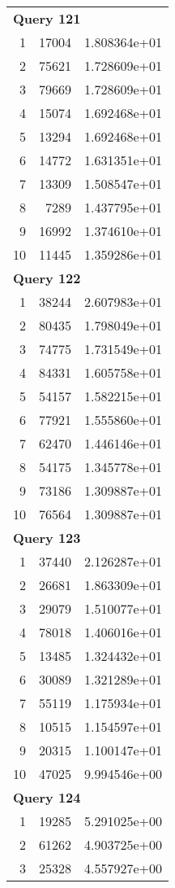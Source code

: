 \begin{longtable}[{p}]{@{}rrp{}@{}}
\midrule
\multicolumn{3}{l}{\bfseries Query 121} \\
1 & 17004 & 1.808364e+01 \\
2 & 75621 & 1.728609e+01 \\
3 & 79669 & 1.728609e+01 \\
4 & 15074 & 1.692468e+01 \\
5 & 13294 & 1.692468e+01 \\
6 & 14772 & 1.631351e+01 \\
7 & 13309 & 1.508547e+01 \\
8 & 7289 & 1.437795e+01 \\
9 & 16992 & 1.374610e+01 \\
10 & 11445 & 1.359286e+01 \\
\midrule
\multicolumn{3}{l}{\bfseries Query 122} \\
1 & 38244 & 2.607983e+01 \\
2 & 80435 & 1.798049e+01 \\
3 & 74775 & 1.731549e+01 \\
4 & 84331 & 1.605758e+01 \\
5 & 54157 & 1.582215e+01 \\
6 & 77921 & 1.555860e+01 \\
7 & 62470 & 1.446146e+01 \\
8 & 54175 & 1.345778e+01 \\
9 & 73186 & 1.309887e+01 \\
10 & 76564 & 1.309887e+01 \\
\midrule
\multicolumn{3}{l}{\bfseries Query 123} \\
1 & 37440 & 2.126287e+01 \\
2 & 26681 & 1.863309e+01 \\
3 & 29079 & 1.510077e+01 \\
4 & 78018 & 1.406016e+01 \\
5 & 13485 & 1.324432e+01 \\
6 & 30089 & 1.321289e+01 \\
7 & 55119 & 1.175934e+01 \\
8 & 10515 & 1.154597e+01 \\
9 & 20315 & 1.100147e+01 \\
10 & 47025 & 9.994546e+00 \\
\midrule
\multicolumn{3}{l}{\bfseries Query 124} \\
1 & 19285 & 5.291025e+00 \\
2 & 61262 & 4.903725e+00 \\
3 & 25328 & 4.557927e+00 \\

\end{longtable}
